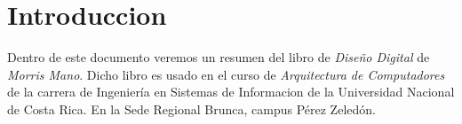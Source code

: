 \section{Introduccion}
    Dentro de este documento veremos un resumen del libro 
    de \textit{Diseño Digital} de \textit{Morris Mano}. Dicho libro 
    es usado en el curso de \textit{Arquitectura de Computadores} 
    de la carrera de Ingeniería en Sistemas de Informacion de la Universidad
    Nacional de Costa Rica. En la Sede Regional Brunca, campus Pérez Zeledón.